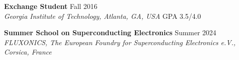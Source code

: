 \documentclass[a4paper,10pt]{article}
\begin{document}
\vspace{0.7mm}
\textbf{Exchange Student} \hfill Fall 2016\\
\textit{Georgia Institute of Technology, Atlanta, GA, USA} \textbar{} GPA 3.5/4.0

\vspace{0.7mm}
\textbf{Summer School on Superconducting Electronics} \hfill Summer 2024\\
\textit{FLUXONICS, The European Foundry for Superconducting Electronics e.V., Corsica, France}
\end{document}
